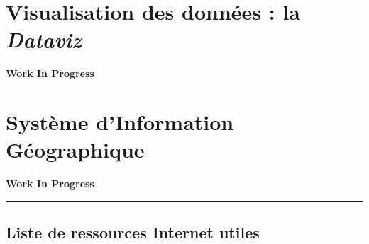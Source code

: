 \documentclass[
]{book}
\newenvironment{infobox}[1]
  {
  \begin{itemize}
  \renewcommand{\labelitemi}{
    \raisebox{-.7\height}[0pt][0pt]{
      {\setkeys{Gin}{width=3em,keepaspectratio}
        \texttt{[image: images/\#1]}}
    }
  }
  \setlength{\fboxsep}{1em}
  \begin{blackbox}
  \item
  }
  {
  \end{blackbox}
  \end{itemize}
  }
\begin{document}
\hypertarget{dataviz}{%
\chapter{\texorpdfstring{Visualisation des données : la \emph{Dataviz}}{Visualisation des données : la Dataviz}}\label{dataviz}}

\begin{infobox}{caution}

\textbf{Work In Progress}

\end{infobox}

\hypertarget{SIG}{%
\chapter{Système d'Information Géographique}\label{SIG}}

\begin{infobox}{caution}

\textbf{Work In Progress}

\end{infobox}

\begin{center}\rule{0.5\linewidth}{0.5pt}\end{center}

\hypertarget{ref-sig}{%
\section*{Liste de ressources Internet utiles}\label{ref-sig}}
\end{document}
